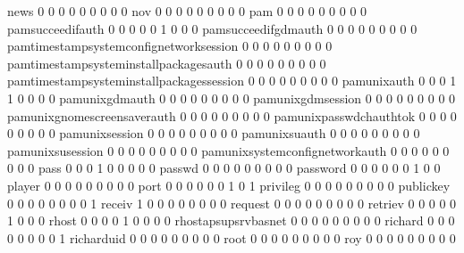 \documentclass[compress,8pt]{beamer}
\begin{document}
\begin{frame}
\begin{Schunk}
  news                                       0   0   0   0   0   0   0   0   0
  nov                                        0   0   0   0   0   0   0   0   0
  pam                                        0   0   0   0   0   0   0   0   0
  pamsucceedifauth                           0   0   0   0   0   1   0   0   0
  pamsucceedifgdmauth                        0   0   0   0   0   0   0   0   0
  pamtimestampsystemconfignetworksession     0   0   0   0   0   0   0   0   0
  pamtimestampsysteminstallpackagesauth      0   0   0   0   0   0   0   0   0
  pamtimestampsysteminstallpackagessession   0   0   0   0   0   0   0   0   0
  pamunixauth                                0   0   0   1   1   0   0   0   0
  pamunixgdmauth                             0   0   0   0   0   0   0   0   0
  pamunixgdmsession                          0   0   0   0   0   0   0   0   0
  pamunixgnomescreensaverauth                0   0   0   0   0   0   0   0   0
  pamunixpasswdchauthtok                     0   0   0   0   0   0   0   0   0
  pamunixsession                             0   0   0   0   0   0   0   0   0
  pamunixsuauth                              0   0   0   0   0   0   0   0   0
  pamunixsusession                           0   0   0   0   0   0   0   0   0
  pamunixsystemconfignetworkauth             0   0   0   0   0   0   0   0   0
  pass                                       0   0   0   1   0   0   0   0   0
  passwd                                     0   0   0   0   0   0   0   0   0
  password                                   0   0   0   0   0   0   1   0   0
  player                                     0   0   0   0   0   0   0   0   0
  port                                       0   0   0   0   0   0   1   0   1
  privileg                                   0   0   0   0   0   0   0   0   0
  publickey                                  0   0   0   0   0   0   0   0   1
  receiv                                     1   0   0   0   0   0   0   0   0
  request                                    0   0   0   0   0   0   0   0   0
  retriev                                    0   0   0   0   0   1   0   0   0
  rhost                                      0   0   0   0   1   0   0   0   0
  rhostapsupsrvbasnet                        0   0   0   0   0   0   0   0   0
  richard                                    0   0   0   0   0   0   0   0   1
  richarduid                                 0   0   0   0   0   0   0   0   0
  root                                       0   0   0   0   0   0   0   0   0
  roy                                        0   0   0   0   0   0   0   0   0

\end{Schunk}
\end{frame}
\end{document}
